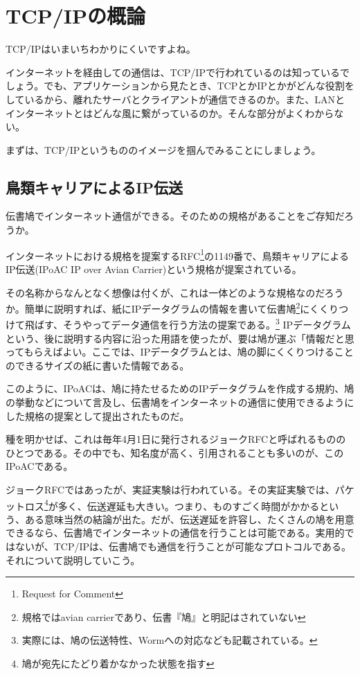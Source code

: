 \chapter{TCP/IPの概論}

TCP/IPはいまいちわかりにくいですよね。

インターネットを経由しての通信は、TCP/IPで行われているのは知っているでしょう。でも、アプリケーションから見たとき、TCPとかIPとかがどんな役割をしているから、離れたサーバとクライアントが通信できるのか。また、LANとインターネットとはどんな風に繋がっているのか。そんな部分がよくわからない。

まずは、TCP/IPというもののイメージを掴んでみることにしましょう。

\section{鳥類キャリアによるIP伝送}

伝書鳩でインターネット通信ができる。そのための規格があることをご存知だろうか。

インターネットにおける規格を提案するRFC\footnote{Request for Comment}の1149番で、鳥類キャリアによるIP伝送(IPoAC IP over Avian Carrier)という規格が提案されている。

その名称からなんとなく想像は付くが、これは一体どのような規格なのだろうか。簡単に説明すれば、紙にIPデータグラムの情報を書いて伝書鳩\footnote{規格ではavian carrierであり、伝書『鳩』と明記はされていない}にくくりつけて飛ばす、そうやってデータ通信を行う方法の提案である。\footnote{実際には、鳩の伝送特性、Wormへの対応なども記載されている。}
IPデータグラムという、後に説明する内容に沿った用語を使ったが、要は鳩が運ぶ「情報だと思ってもらえばよい。ここでは、IPデータグラムとは、鳩の脚にくくりつけることのできるサイズの紙に書いた情報である。

このように、IPoACは、鳩に持たせるためのIPデータグラムを作成する規約、鳩の挙動などについて言及し、伝書鳩をインターネットの通信に使用できるようにした規格の提案として提出されたものだ。

種を明かせば、これは毎年4月1日に発行されるジョークRFCと呼ばれるもののひとつである。その中でも、知名度が高く、引用されることも多いのが、このIPoACである。

ジョークRFCではあったが、実証実験は行われている。その実証実験では、パケットロス\footnote{鳩が宛先にたどり着かなかった状態を指す}が多く、伝送遅延も大きい。つまり、ものすごく時間がかかるという、ある意味当然の結論が出た。だが、伝送遅延を許容し、たくさんの鳩を用意できるなら、伝書鳩でインターネットの通信を行うことは可能である。実用的ではないが、TCP/IPは、伝書鳩でも通信を行うことが可能なプロトコルである。それについて説明していこう。



